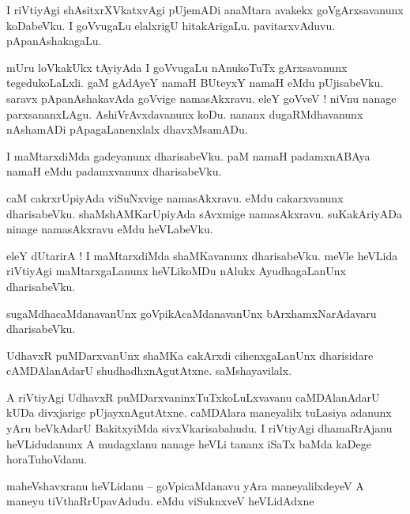 \documentclass{article}
\begin{document}
\begin{mn}%
I riVtiyAgi shAsitxrXVkatxvAgi pUjemADi anaMtara avakekx goVgArxsavanunx koDabeVku. I goVvugaLu 
elalxrigU hitakArigaLu. pavitarxvAduvu. pApanAshakagaLu.
\end{mn}

\begin{mn}%
mUru loVkakUkx tAyiyAda I goVvugaLu nAnukoTuTx gArxsavanunx tegedukoLaLxli. gaM gAdAyeY namaH 
BUteyxY namaH eMdu  pUjisabeVku. saravx pApanAshakavAda goVvige namasAkxravu. eleY goVveV ! niVnu 
nanage parxsananxLAgu. AshiVrAvxdavanunx koDu. nananx dugaRMdhavanunx nAshamADi pApagaLanenxlalx 
dhavxMsamADu.
\end{mn}

\begin{mn}%
I maMtarxdiMda gadeyanunx dharisabeVku. paM namaH padamxnABAya namaH eMdu padamxvanunx dharisabeVku.
\end{mn}

\begin{mn}%
caM cakrxrUpiyAda viSuNxvige namasAkxravu. eMdu cakarxvanunx dharisabeVku. shaMshAMKarUpiyAda 
sAvxmige namasAkxravu. suKakAriyADa ninage namasAkxravu eMdu heVLabeVku.
\end{mn}

\begin{mn}%
eleY dUtarirA ! I maMtarxdiMda shaMKavanunx dharisabeVku. meVle heVLida riVtiyAgi maMtarxgaLanunx 
heVLikoMDu nAlukx AyudhagaLanUnx dharisabeVku.
\end{mn}

\begin{mn}%
sugaMdhacaMdanavanUnx goVpikAcaMdanavanUnx bArxhamxNarAdavaru dharisabeVku.
\end{mn}

\begin{mn}%
UdhavxR puMDarxvanUnx shaMKa cakArxdi cihenxgaLanUnx dharisidare cAMDAlanAdarU shudhadhxnAgutAtxne. 
saMshayavilalx.
\end{mn}

\begin{mn}%
A riVtiyAgi UdhavxR puMDarxvaninxTuTxkoLuLxvavanu caMDAlanAdarU kUDa divxjarige pUjayxnAgutAtxne. 
caMDAlara maneyalilx tuLasiya adanunx yAru beVkAdarU BakitxyiMda sivxVkarisabahudu. I riVtiyAgi 
dhamaRrAjanu heVLidudanunx A mudagxlanu nanage heVLi tananx iSaTx baMda kaDege horaTuhoVdanu.
\end{mn}

\begin{mn}%
maheVshavxranu heVLidanu -- goVpicaMdanavu yAra maneyalilxdeyeV A maneyu tiVthaRrUpavAdudu. eMdu 
viSuknxveV heVLidAdxne
\end{mn}
\end{document}
